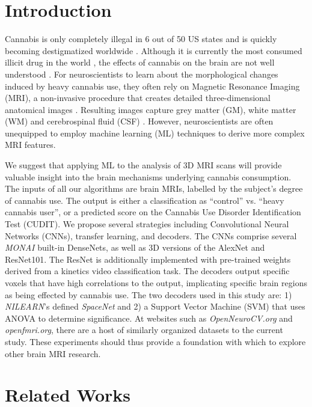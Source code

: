 \documentclass[conference]{IEEEtran}
\begin{document}
\section{Introduction}
Cannabis is only completely illegal in 6 out of 50 US states and is quickly becoming destigmatized worldwide \cite{b1}. Although it is currently the most consumed illicit drug in the world \cite{b2}, the effects of cannabis on the brain are not well understood \cite{b0}. For neuroscientists to learn about the morphological changes induced by heavy cannabis use, they often rely on Magnetic Resonance Imaging (MRI), a non-invasive procedure that creates detailed three-dimensional anatomical images \cite{b4}. Resulting images capture grey matter (GM), white matter (WM) and cerebrospinal fluid (CSF) \cite{b4}. However, neuroscientists are often unequipped to employ machine learning (ML) techniques to derive more complex MRI features. 

We suggest that applying ML to the analysis of 3D MRI scans will provide valuable insight into the brain mechanisms underlying cannabis consumption. The inputs of all our algorithms are brain MRIs, labelled by the subject’s degree of cannabis use. The output is either a classification as “control” vs. “heavy cannabis user”, or a predicted score on the Cannabis Use Disorder Identification Test (CUDIT). We propose several strategies including Convolutional Neural Networks (CNNs), transfer learning, and decoders. The CNNs comprise several \textit{MONAI} built-in DenseNets, as well as 3D versions of the AlexNet and ResNet101. The ResNet is additionally implemented with pre-trained weights derived from a kinetics video classification task. The decoders output specific voxels that have high correlations to the output, implicating specific brain regions as being effected by cannabis use. The two decoders used in this study are: 1) \textit{NILEARN}'s defined \textit{SpaceNet} and 2) a Support Vector Machine (SVM) that uses ANOVA to determine significance. At websites such as \textit{OpenNeuroCV.org} and \textit{openfmri.org}, there are a host of similarly organized datasets to the current study. These experiments should thus provide a foundation with which to explore other brain MRI research.  


\section{Related Works}
\end{document}
